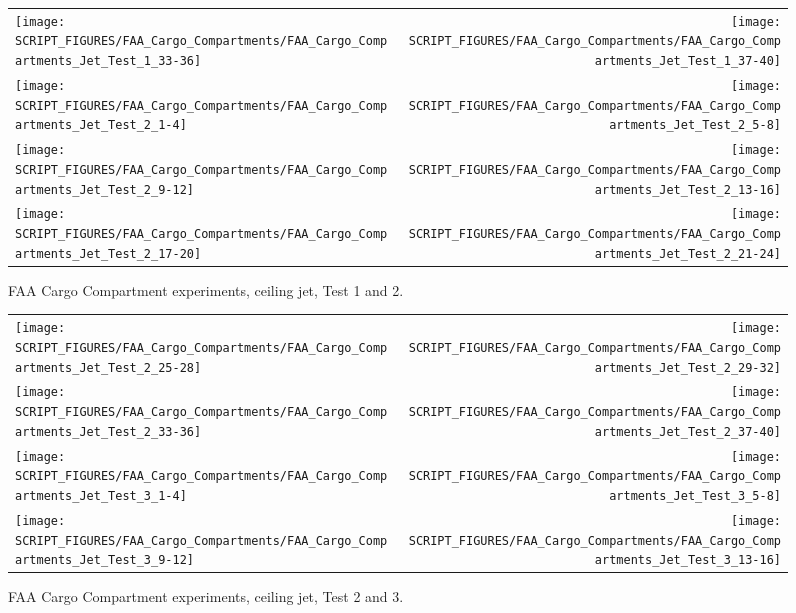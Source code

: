 \begin{figure}[p]
\begin{tabular*}{\textwidth}{l@{\extracolsep{\fill}}r}
\texttt{[image: SCRIPT\_FIGURES/FAA\_Cargo\_Compartments/FAA\_Cargo\_Compartments\_Jet\_Test\_1\_33-36]} &
\texttt{[image: SCRIPT\_FIGURES/FAA\_Cargo\_Compartments/FAA\_Cargo\_Compartments\_Jet\_Test\_1\_37-40]} \\
\texttt{[image: SCRIPT\_FIGURES/FAA\_Cargo\_Compartments/FAA\_Cargo\_Compartments\_Jet\_Test\_2\_1-4]} &
\texttt{[image: SCRIPT\_FIGURES/FAA\_Cargo\_Compartments/FAA\_Cargo\_Compartments\_Jet\_Test\_2\_5-8]} \\
\texttt{[image: SCRIPT\_FIGURES/FAA\_Cargo\_Compartments/FAA\_Cargo\_Compartments\_Jet\_Test\_2\_9-12]} &
\texttt{[image: SCRIPT\_FIGURES/FAA\_Cargo\_Compartments/FAA\_Cargo\_Compartments\_Jet\_Test\_2\_13-16]} \\
\texttt{[image: SCRIPT\_FIGURES/FAA\_Cargo\_Compartments/FAA\_Cargo\_Compartments\_Jet\_Test\_2\_17-20]} &
\texttt{[image: SCRIPT\_FIGURES/FAA\_Cargo\_Compartments/FAA\_Cargo\_Compartments\_Jet\_Test\_2\_21-24]}
\end{tabular*}
\caption[FAA Cargo Compartment experiments, ceiling jet, Test 1 and 2]
{FAA Cargo Compartment experiments, ceiling jet, Test 1 and 2.}
\label{FAA_Cargo_HGL_2}
\end{figure}

\begin{figure}[p]
\begin{tabular*}{\textwidth}{l@{\extracolsep{\fill}}r}
\texttt{[image: SCRIPT\_FIGURES/FAA\_Cargo\_Compartments/FAA\_Cargo\_Compartments\_Jet\_Test\_2\_25-28]} &
\texttt{[image: SCRIPT\_FIGURES/FAA\_Cargo\_Compartments/FAA\_Cargo\_Compartments\_Jet\_Test\_2\_29-32]} \\
\texttt{[image: SCRIPT\_FIGURES/FAA\_Cargo\_Compartments/FAA\_Cargo\_Compartments\_Jet\_Test\_2\_33-36]} &
\texttt{[image: SCRIPT\_FIGURES/FAA\_Cargo\_Compartments/FAA\_Cargo\_Compartments\_Jet\_Test\_2\_37-40]} \\
\texttt{[image: SCRIPT\_FIGURES/FAA\_Cargo\_Compartments/FAA\_Cargo\_Compartments\_Jet\_Test\_3\_1-4]} &
\texttt{[image: SCRIPT\_FIGURES/FAA\_Cargo\_Compartments/FAA\_Cargo\_Compartments\_Jet\_Test\_3\_5-8]} \\
\texttt{[image: SCRIPT\_FIGURES/FAA\_Cargo\_Compartments/FAA\_Cargo\_Compartments\_Jet\_Test\_3\_9-12]} &
\texttt{[image: SCRIPT\_FIGURES/FAA\_Cargo\_Compartments/FAA\_Cargo\_Compartments\_Jet\_Test\_3\_13-16]}
\end{tabular*}
\caption[FAA Cargo Compartment experiments, ceiling jet, Test 2 and 3]
{FAA Cargo Compartment experiments, ceiling jet, Test 2 and 3.}
\label{FAA_Cargo_HGL_3}
\end{figure}

